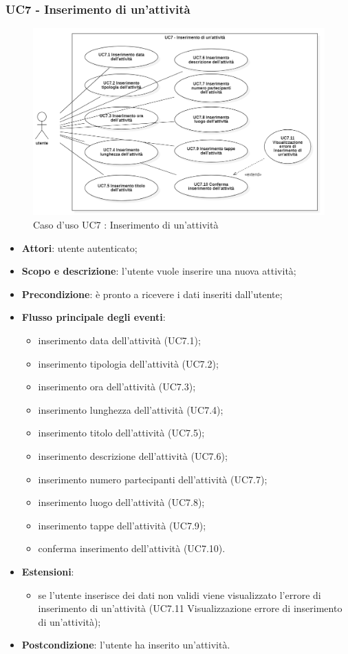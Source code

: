 \subsubsection{UC7 - Inserimento di un'attività}
\begin{figure}[H]
	\centering
	\includegraphics[width=0.8\linewidth]{res/images/UC7.png}
	\caption{Caso d'uso UC7 : Inserimento di un'attività}
\end{figure}
\begin{itemize}
	\item \textbf{Attori}: utente autenticato;
	\item \textbf{Scopo e descrizione}: l’utente vuole inserire una nuova attività;
	\item \textbf{Precondizione}: è pronto a ricevere i dati inseriti dall'utente;
	\item \textbf{Flusso principale degli eventi}:
	\begin{itemize}
		\item inserimento data dell’attività (UC7.1);
		\item inserimento tipologia dell’attività (UC7.2);
		\item inserimento ora dell’attività (UC7.3);
		\item inserimento lunghezza dell’attività (UC7.4);
		\item inserimento titolo dell’attività (UC7.5);
		\item inserimento descrizione dell’attività (UC7.6);
		\item inserimento numero partecipanti dell’attività (UC7.7);
		\item inserimento luogo dell’attività (UC7.8);
		\item inserimento tappe dell’attività (UC7.9);
		\item conferma inserimento dell’attività (UC7.10).
	\end{itemize}
\item \textbf{Estensioni}:
\begin{itemize}
	\item se l’utente inserisce dei dati non validi viene visualizzato l’errore di inserimento di un'attività (UC7.11 Visualizzazione errore di inserimento di un'attività);
\end{itemize}
	\item \textbf{Postcondizione}: l’utente ha inserito un'attività.
\end{itemize}

